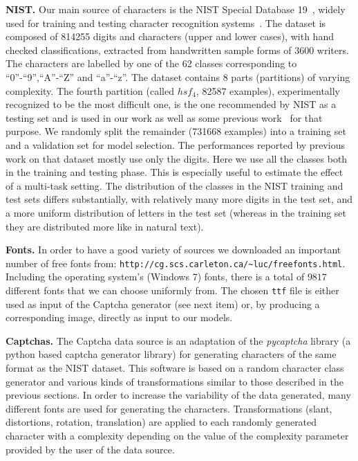 \documentclass{article} %
\begin{document}
{\bf NIST.}
Our main source of characters is the NIST Special Database 19~\citep{Grother-1995}, 
widely used for training and testing character
recognition systems~\citep{Granger+al-2007,Cortes+al-2000,Oliveira+al-2002-short,Milgram+al-2005}. 
The dataset is composed of 814255 digits and characters (upper and lower cases), with hand checked classifications,
extracted from handwritten sample forms of 3600 writers. The characters are labelled by one of the 62 classes 
corresponding to ``0''-``9'',``A''-``Z'' and ``a''-``z''. The dataset contains 8 parts (partitions) of varying complexity. 
The fourth partition (called $hsf_4$, 82587 examples), 
experimentally recognized to be the most difficult one, is the one recommended 
by NIST as a testing set and is used in our work as well as some previous work~\citep{Granger+al-2007,Cortes+al-2000,Oliveira+al-2002-short,Milgram+al-2005}
for that purpose. We randomly split the remainder (731668 examples) into a training set and a validation set for
model selection. 
The performances reported by previous work on that dataset mostly use only the digits.
Here we use all the classes both in the training and testing phase. This is especially
useful to estimate the effect of a multi-task setting.
The distribution of the classes in the NIST training and test sets differs
substantially, with relatively many more digits in the test set, and a more uniform distribution
of letters in the test set (whereas in the training set they are distributed
more like in natural text).

{\bf Fonts.} 
In order to have a good variety of sources we downloaded an important number of free fonts from:
{\tt http://cg.scs.carleton.ca/\textasciitilde luc/freefonts.html}.
Including the operating system's (Windows 7) fonts, there is a total of $9817$ different fonts that we can choose uniformly from.
The chosen {\tt ttf} file is either used as input of the Captcha generator (see next item) or, by producing a corresponding image, 
directly as input to our models.

{\bf Captchas.}
The Captcha data source is an adaptation of the \emph{pycaptcha} library (a python based captcha generator library) for 
generating characters of the same format as the NIST dataset. This software is based on
a random character class generator and various kinds of transformations similar to those described in the previous sections. 
In order to increase the variability of the data generated, many different fonts are used for generating the characters. 
Transformations (slant, distortions, rotation, translation) are applied to each randomly generated character with a complexity
depending on the value of the complexity parameter provided by the user of the data source. 
\end{document}
